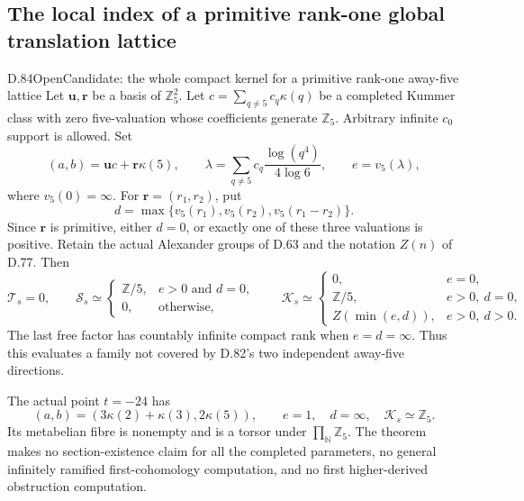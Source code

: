 \subsection{The local index of a primitive rank-one global translation lattice}

\begin{statement}{D.84}{Open}{Candidate: the whole compact kernel for a primitive rank-one away-five lattice}
Let \(\mathbf u,\mathbf r\) be a basis of \(\mathbb Z_5^2\).
Let \(c=\sum_{q\ne5}c_q\kappa(q)\) be a completed Kummer
class with zero five-valuation whose coefficients generate
\(\mathbb Z_5\). Arbitrary infinite \(c_0\) support is allowed.
Set
\[
 (a,b)=\mathbf u c+\mathbf r\kappa(5),\qquad
 \lambda=\sum_{q\ne5}c_q\frac{\log(q^4)}{4\log6},\qquad
 e=v_5(\lambda),
                                                                  \tag{D.84.1}
\]
where \(v_5(0)=\infty\). For
\(\mathbf r=(r_1,r_2)\), put
\[
 d=\max\{v_5(r_1),v_5(r_2),v_5(r_1-r_2)\}.
                                                                  \tag{D.84.2}
\]
Since \(\mathbf r\) is primitive, either \(d=0\), or exactly
one of these three valuations is positive. Retain the actual
Alexander groups of D.63 and the notation \(Z(n)\) of D.77.
Then
\[
 \mathcal T_s=0,\qquad
 \mathcal S_s\simeq
 \begin{cases}
  \mathbb Z/5,&e>0\text{ and }d=0,\\
  0,&\text{otherwise},
 \end{cases}
 \qquad
 \mathcal K_s\simeq
 \begin{cases}
  0,&e=0,\\
  \mathbb Z/5,&e>0,\ d=0,\\
  Z(\min(e,d)),&e>0,\ d>0.
 \end{cases}                                                     \tag{D.84.3}
\]
The last free factor has countably infinite compact rank when
\(e=d=\infty\). Thus this evaluates a family not covered by
D.82's two independent away-five directions.

The actual point \(t=-24\) has
\[
 (a,b)=(3\kappa(2)+\kappa(3),2\kappa(5)),\qquad
 e=1,\quad d=\infty,\quad \mathcal K_s\simeq\mathbb Z_5.
                                                                  \tag{D.84.4}
\]
Its metabelian fibre is nonempty and is a torsor under
\(\prod_{\mathbb N}\mathbb Z_5\). The theorem makes no
section-existence claim for all the completed parameters,
no general infinitely ramified first-cohomology computation,
and no first higher-derived obstruction computation.
\end{statement}

